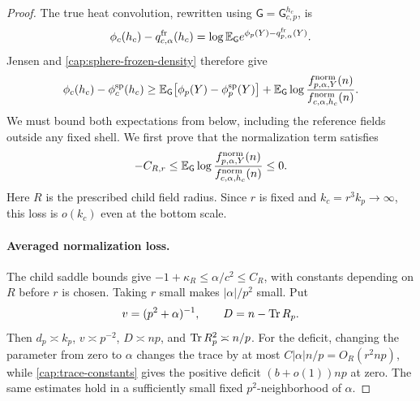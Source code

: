 \begin{proof}
The true heat convolution, rewritten using \(\mathsf G=\mathsf G_{c,p}^{h_c}\),
is
\[
 \phi_c(h_c)-q_{c,\alpha}^{\rm fr}(h_c)
 =\log\mathbb E_{\mathsf G}e^{\phi_p(Y)-q_{p,\alpha}^{\rm fr}(Y)} .
\]
Jensen and \eqref{cap:sphere-frozen-density} therefore give
\begin{equation}\label{cap:frozen-jensen}
 \phi_c(h_c)-\phi_c^{\rm sp}(h_c)
 \ge \mathbb E_{\mathsf G}\bigl[\phi_p(Y)-\phi_p^{\rm sp}(Y)\bigr]
   +\mathbb E_{\mathsf G}\log
       \frac{f_{p,\alpha,Y}^{\rm norm}(n)}
            {f_{c,\alpha,h_c}^{\rm norm}(n)} .
\end{equation}
We must bound both expectations from below, including the reference fields
outside any fixed shell. We first prove that the normalization term satisfies
\begin{equation}\label{cap:averaged-frozen-density}
 -C_{R,r}\le
 \mathbb E_{\mathsf G}\log
       \frac{f_{p,\alpha,Y}^{\rm norm}(n)}
            {f_{c,\alpha,h_c}^{\rm norm}(n)}
 \le0 .
\end{equation}
Here $R$ is the prescribed child field radius. Since $r$ is fixed and
$k_c=r^3k_p\to\infty$, this loss is $o(k_c)$ even at the bottom scale.

\paragraph{Averaged normalization loss.}
The child saddle bounds give $-1+\kappa_R\le\alpha/c^2\le C_R$,
with constants depending on $R$ before $r$ is chosen. Taking $r$ small
makes $|\alpha|/p^2$ small. Put
\[
 v=(p^2+\alpha)^{-1},\qquad D=n-\operatorname{Tr} R_p.
\]
Then $d_p\asymp k_p$, $v\asymp p^{-2}$, $D\asymp np$, and
$\operatorname{Tr} R_p^2\asymp n/p$. For the deficit, changing the parameter from
zero to $\alpha$ changes the trace by at most
$C|\alpha|n/p=O_R(r^2np)$, while \eqref{cap:trace-constants} gives
the positive deficit $(b+o(1))np$ at zero. The same estimates hold in
a sufficiently small fixed $p^2$-neighborhood of $\alpha$.


\end{proof}
